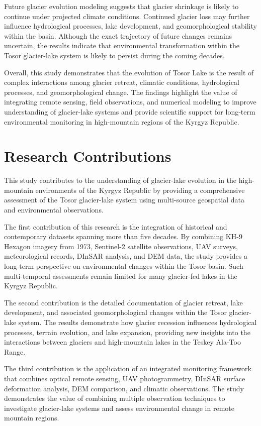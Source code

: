 \documentclass[12pt,a4paper]{report}
\begin{document}
Future glacier evolution modeling suggests that glacier shrinkage is likely to continue under projected climate conditions. Continued glacier loss may further influence hydrological processes, lake development, and geomorphological stability within the basin. Although the exact trajectory of future changes remains uncertain, the results indicate that environmental transformation within the Tosor glacier-lake system is likely to persist during the coming decades.

Overall, this study demonstrates that the evolution of Tosor Lake is the result of complex interactions among glacier retreat, climatic conditions, hydrological processes, and geomorphological change. The findings highlight the value of integrating remote sensing, field observations, and numerical modeling to improve understanding of glacier-lake systems and provide scientific support for long-term environmental monitoring in high-mountain regions of the Kyrgyz Republic.

\section{Research Contributions}

This study contributes to the understanding of glacier-lake evolution in the high-mountain environments of the Kyrgyz Republic by providing a comprehensive assessment of the Tosor glacier-lake system using multi-source geospatial data and environmental observations.

The first contribution of this research is the integration of historical and contemporary datasets spanning more than five decades. By combining KH-9 Hexagon imagery from 1973, Sentinel-2 satellite observations, UAV surveys, meteorological records, DInSAR analysis, and DEM data, the study provides a long-term perspective on environmental changes within the Tosor basin. Such multi-temporal assessments remain limited for many glacier-fed lakes in the Kyrgyz Republic.

The second contribution is the detailed documentation of glacier retreat, lake development, and associated geomorphological changes within the Tosor glacier-lake system. The results demonstrate how glacier recession influences hydrological processes, terrain evolution, and lake expansion, providing new insights into the interactions between glaciers and high-mountain lakes in the Teskey Ala-Too Range.

The third contribution is the application of an integrated monitoring framework that combines optical remote sensing, UAV photogrammetry, DInSAR surface deformation analysis, DEM comparison, and climatic observations. The study demonstrates the value of combining multiple observation techniques to investigate glacier-lake systems and assess environmental change in remote mountain regions.
\end{document}
